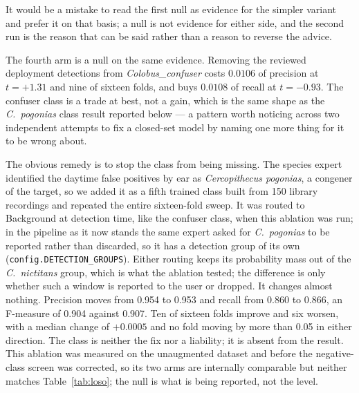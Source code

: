\documentclass[review,3p,times]{elsarticle}
\begin{document}
It would be a mistake to read the first null as evidence for
the simpler variant and prefer it on that basis; a null is not evidence for
either side, and the second run is the reason that can be said rather than a
reason to reverse the advice.

The fourth arm is a null on the same evidence. Removing the reviewed deployment
detections from \textit{Colobus\_confuser} costs $0.0106$ of precision at
$t = +1.31$ and nine of sixteen folds, and buys $0.0108$ of recall at
$t = -0.93$. The confuser class is a trade at best, not a gain, which is the
same shape as the \textit{C.\ pogonias} class result reported below --- a
pattern worth noticing across two independent attempts to fix a closed-set model
by naming one more thing for it to be wrong about.

The obvious remedy is to stop the class from being missing. The species expert
identified the daytime false positives by ear as \textit{Cercopithecus
pogonias}, a congener of the target, so we added it as a fifth trained class
built from 150 library recordings and repeated the entire sixteen-fold sweep.
It was routed to Background at detection time, like the confuser class, when
this ablation was run; in the pipeline as it now stands the same expert asked
for \textit{C.\ pogonias} to be reported rather than discarded, so it has a
detection group of its own (\texttt{config.DETECTION\_GROUPS}). Either routing
keeps its probability mass out of the \textit{C.\ nictitans} group, which is
what the ablation tested; the difference is only whether such a window is
reported to the user or dropped.
It changes almost nothing. Precision moves from 0.954 to 0.953 and recall from
0.860 to 0.866, an F-measure of 0.904 against 0.907. Ten of sixteen folds improve
and six worsen, with a median change of $+0.0005$ and no fold moving by more than
0.05 in either direction. The class is neither the fix nor a liability; it is
absent from the result. This ablation was measured on the unaugmented dataset and
before the negative-class screen was corrected, so its two arms are internally
comparable but neither matches Table~\ref{tab:loso}; the null is what is being
reported, not the level.
\end{document}

